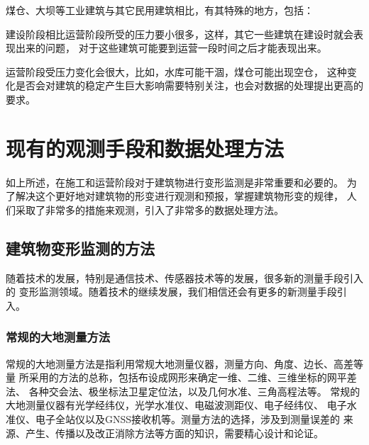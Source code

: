 煤仓、大坝等工业建筑与其它民用建筑相比，有其特殊的地方，包括：
\begin{asparaitem}[$\bullet$]
\item 建设阶段相比运营阶段所受的压力要小很多，这样，其它一些建筑在建设时就会表现出来的问题，
对于这些建筑可能要到运营一段时间之后才能表现出来。
\item 运营阶段受压力变化会很大，比如，水库可能干涸，煤仓可能出现空仓，
这种变化是否会对建筑的稳定产生巨大影响需要特别关注，也会对数据的处理提出更高的要求。
\end{asparaitem}

\section{现有的观测手段和数据处理方法}
如上所述，在施工和运营阶段对于建筑物进行变形监测是非常重要和必要的。
为了解决这个更好地对建筑物的形变进行观测和预报，掌握建筑物形变的规律，
人们采取了非常多的措施来观测，引入了非常多的数据处理方法。

\subsection{建筑物变形监测的方法}
随着技术的发展，特别是通信技术、传感器技术等的发展，很多新的测量手段引入的
变形监测领域。随着技术的继续发展，我们相信还会有更多的新测量手段引入。
\subsubsection*{常规的大地测量方法}
常规的大地测量方法是指利用常规大地测量仪器，测量方向、角度、边长、高差等量
所采用的方法的总称，包括布设成网形来确定一维、二维、三维坐标的网平差法、
各种交会法、极坐标法卫星定位法，以及几何水准、三角高程法等。
常规的大地测量仪器有光学经纬仪，光学水准仪、电磁波测距仪、电子经纬仪、
电子水准仪、电子全站仪以及GNSS接收机等。测量方法的选择，涉及到测量误差的
来源、产生、传播以及改正消除方法等方面的知识，需要精心设计和论证。
